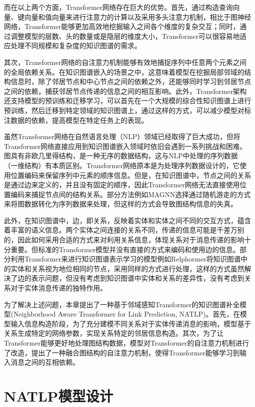 而在以上两个方面，Transformer网络存在巨大的优势。首先，通过构造查询向量、键向量和值向量来进行注意力的计算以及采用多头注意力机制，相比于图神经网络，Transformer能够更加高效地挖掘输入之间各个维度的复杂交互；同时，通过调整模型的层数、头的数量或是隐层的维度大小，Transformer可以很容易地适应处理不同规模和复杂度的知识图谱的需求。

其次，Transformer网络的自注意力机制能够有效地捕捉序列中任意两个元素之间的全局依赖关系。在知识图谱嵌入的场景之中，这意味着模型在挖掘局部邻域的结构信息时，除了邻居节点和中心节点之间的依赖之外，还能够同时学习到邻居节点之间的依赖，捕获邻居节点传递的信息之间的相互影响。此外，Transformer架构还支持模型的预训练和迁移学习，可以首先在一个大规模的综合性知识图谱上进行预训练，然后迁移到特定领域的知识图谱上，通过这样的方式，可以减少模型对标注数据的依赖，提高模型在特定任务上的表现。

虽然Transformer网络在自然语言处理（NLP）领域已经取得了巨大成功，但将Transformer网络直接应用到知识图谱嵌入领域时依旧会遇到一系列挑战和困难。图具有非欧几里得结构，是一种无序的数据结构，这与NLP中处理的序列数据（一维结构）有本质区别。Transformer网络原本是为处理序列数据设计的，它使用位置编码来保留序列中元素的顺序信息。但是，在知识图谱中，节点之间的关系是通过边来定义的，并且没有固定的顺序，因此Transformer网络无法直接使用位置编码来捕捉节点间的结构关系。部分方法例如MAGNN选择通过随机游走的方式来将图数据转化为序列数据来处理，但这样的方式会导致图结构信息的失真。

此外，在知识图谱中，边，即关系，反映着实体和实体之间不同的交互方式，蕴含着丰富的语义信息。两个实体之间连接的关系不同，传递的信息可能是千差万别的，因此如何采用合适的方式来对利用关系信息，体现关系对于消息传递的影响十分重要。但标准的Transformer模型并没有直接的方式来编码和使用边的信息。部分利用Transformer来进行知识图谱表示学习的模型例如Relphormer将知识图谱中的实体和关系视为地位相同的节点，采用同样的方式进行处理，这样的方式虽然解决了边的表示问题，但没有考虑到知识图谱中实体和关系的差异性，没有考虑到关系对于实体消息传递的独特作用。

为了解决上述问题，本章提出了一种基于邻域感知Transformer的知识图谱补全模型(Neighborhood Aware Transformer for Link Prediction, NATLP)。首先，在模型输入信息构造阶段，为了充分建模不同关系对于实体传递消息的影响，模型基于关系生成特定的网络参数，实现关系特定的邻居信息构造。其次，为了让Transformer能够更好地处理图结构数据，模型对Transformer的自注意力机制进行了改造，提出了一种融合图结构的自注意力机制，使得Transformer能够学习到输入消息之间的互相依赖。

\section{NATLP模型设计}

